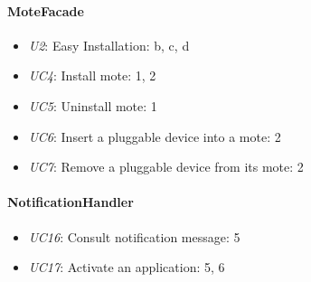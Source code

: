     \paragraph{MoteFacade}
        \begin{itemize}
            \item \emph{U2}: Easy Installation: b, c, d
            \item \emph{UC4}: Install mote: 1, 2
            \item \emph{UC5}: Uninstall mote: 1
            \item \emph{UC6}: Insert a pluggable device into a mote: 2
            \item \emph{UC7}: Remove a pluggable device from its mote: 2
        \end{itemize}

    \paragraph{NotificationHandler}
        \begin{itemize}
            \item \emph{UC16}: Consult notification message: 5
            \item \emph{UC17}: Activate an application: 5, 6
        \end{itemize}

